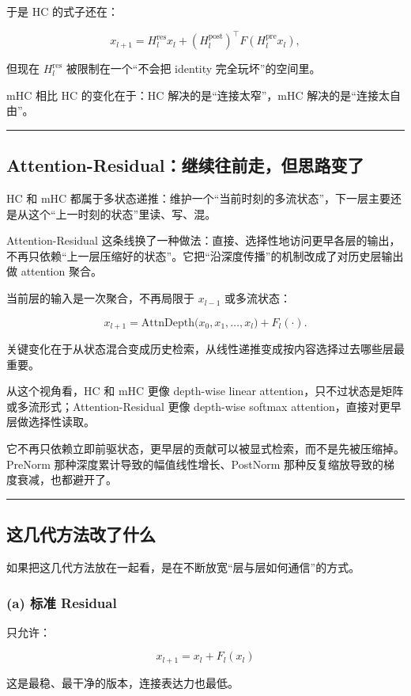 于是 HC 的式子还在：

\[
x_{l+1}
=
H^{\mathrm{res}}_l x_l
+
(H^{\mathrm{post}}_l)^\top
F\!\left(H^{\mathrm{pre}}_l x_l\right),
\]

但现在 \(H^{\mathrm{res}}_l\) 被限制在一个“不会把 identity 完全玩坏”的空间里。

mHC 相比 HC 的变化在于：HC 解决的是“连接太窄”，mHC 解决的是“连接太自由”。

\hrule

\subsection{Attention-Residual：继续往前走，但思路变了}

HC 和 mHC 都属于多状态递推：维护一个“当前时刻的多流状态”，下一层主要还是从这个“上一时刻的状态”里读、写、混。

Attention-Residual 这条线换了一种做法：直接、选择性地访问更早各层的输出，不再只依赖“上一层压缩好的状态”。它把“沿深度传播”的机制改成了对历史层输出做 attention 聚合。

当前层的输入是一次聚合，不再局限于 \(x_{l-1}\) 或多流状态：

\[
x_{l+1}
=
\mathrm{AttnDepth}\!\big(x_0,x_1,\dots,x_l\big)
+
F_l(\cdot).
\]

关键变化在于从状态混合变成历史检索，从线性递推变成按内容选择过去哪些层最重要。

从这个视角看，HC 和 mHC 更像 depth-wise linear attention，只不过状态是矩阵或多流形式；Attention-Residual 更像 depth-wise softmax attention，直接对更早层做选择性读取。

它不再只依赖立即前驱状态，更早层的贡献可以被显式检索，而不是先被压缩掉。PreNorm 那种深度累计导致的幅值线性增长、PostNorm 那种反复缩放导致的梯度衰减，也都避开了。

\hrule

\subsection{这几代方法改了什么}

如果把这几代方法放在一起看，是在不断放宽“层与层如何通信”的方式。

\subsubsection{(a) 标准 Residual}

只允许：

\[
x_{l+1}=x_l+F_l(x_l)
\]

这是最稳、最干净的版本，连接表达力也最低。

